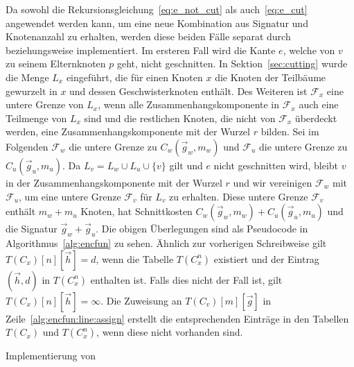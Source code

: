 Da sowohl die Rekursionsgleichung~\eqref{eq:e_not_cut} als auch~\eqref{eq:e_cut} angewendet werden kann, um eine neue Kombination aus Signatur und Knotenanzahl zu erhalten, werden diese beiden Fälle separat durch \encfun{} beziehungsweise \ecfun{} implementiert.
Im ersteren Fall wird die Kante $e$, welche von $v$ zu seinem Elternknoten $p$ geht, nicht geschnitten.
 In Sektion~\ref{sec:cutting} wurde die Menge $L_x$ eingeführt, die für einen Knoten $x$ die Knoten der Teilbäume gewurzelt in $x$ und dessen Geschwisterknoten enthält.
Des Weiteren ist $\mathcal{F}_x$ eine untere Grenze von $L_x$, wenn alle Zusammenhangskomponente in $\mathcal{F}_x$ auch eine Teilmenge von $L_x$ sind und die restlichen Knoten, die nicht von $\mathcal{F}_x$ überdeckt werden, eine Zusammenhangskomponente mit der Wurzel $r$ bilden.
Sei im Folgenden $\mathcal{F}_w$ die untere Grenze zu $C_w(\vec{g}_w, m_w)$ und $\mathcal{F}_u$ die untere Grenze zu $C_u(\vec{g}_u, m_u)$.
Da $L_v = L_w \cup L_u \cup \{v\}$ gilt und $e$ nicht geschnitten wird, bleibt $v$ in der Zusammenhangskomponente mit der Wurzel $r$ und wir vereinigen $\mathcal{F}_w$ mit $\mathcal{F}_u$, um eine untere Grenze $\mathcal{F}_v$ für $L_v$ zu erhalten.
Diese untere Grenze $\mathcal{F}_v$ enthält $m_w + m_u$ Knoten, hat Schnittkosten $C_w(\vec{g}_w, m_w) + C_u(\vec{g}_u, m_u)$ und die Signatur $\vec{g}_w + \vec{g}_u$.
Die obigen Überlegungen sind als Pseudocode in Algorithmus~\ref{alg:encfun} zu sehen.
Ähnlich zur vorherigen Schreibweise gilt $T(C_x)[n][\vec{h}] = d$, wenn die Tabelle $T(C^n_x)$ existiert und der Eintrag $(\vec{h}, d)$ in $T(C^n_x)$ enthalten ist.
Falls dies nicht der Fall ist, gilt $T(C_x)[n][\vec{h}] = \infty$.
Die Zuweisung an $T(C_v)[m][\vec{g}]$ in Zeile~\ref{alg:encfun:line:assign} erstellt die entsprechenden Einträge in den Tabellen $T(C_x)$ und $T(C_x^n)$, wenn diese nicht vorhanden sind.

\begin{algorithm}
    \caption{Implementierung von }\label{alg:encfun}
    \begin{algorithmic}[1]
            \label{alg:encfun:line:assign}
        \EndFunction
    \end{algorithmic}
\end{algorithm}

